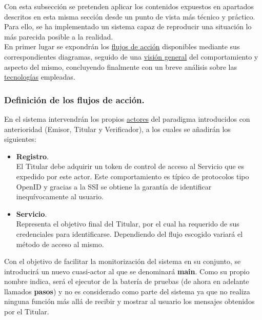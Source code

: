 \documentclass[../main.tex]{subfiles}
\begin{document}
Con esta subsección se pretenden aplicar los contenidos expuestos en apartados descritos en esta misma sección desde un punto de vista más técnico y práctico. Para ello, se ha implementado un sistema capaz de reproducir una situación lo más parecida posible a la realidad. 
\\

En primer lugar se expondrán los \hyperref[Definición de flujos de acción]{flujos de acción} disponibles mediante sus correspondientes diagramas, seguido de una \hyperref[Visión general del sistema]{visión general} del comportamiento y aspecto del mismo, concluyendo finalmente con un breve análisis sobre las \hyperref[Análisis sobre las tecnologías empleadas]{tecnologías} empleadas.
\\

\subsubsection{Definición de los flujos de acción.}\label{Definición de flujos de acción}

En el sistema intervendrán los propios \hyperref[Actores y sus funciones en el paradigma]{actores} del paradigma introducidos con anterioridad (Emisor, Titular y Verificador), a los cuales se añadirán los siguientes:

\begin{itemize}
    \item \textbf{Registro}. \\
    El Titular debe adquirir un token de control de acceso al Servicio que es expedido por este actor. Este comportamiento es típico de protocolos tipo \Gls{OpenID} y gracias a la \acrshort{SSI} se obtiene la garantía de identificar inequívocamente al usuario. 

    \item \textbf{Servicio}. \\
    Representa el objetivo final del Titular, por el cual ha requerido de sus credenciales para identificarse. Dependiendo del flujo escogido variará  el método de acceso al mismo.\\
    
\end{itemize}

Con el objetivo de facilitar la monitorización del sistema en su conjunto, se introducirá un nuevo cuasi-actor al que se denominará \textbf{main}. Como su propio nombre indica, será el ejecutor de la batería de pruebas (de ahora en adelante llamados \textbf{pasos}) y no es considerado como parte del sistema ya que no realiza ninguna función más allá de recibir y mostrar al usuario los mensajes obtenidos por el Titular. 
\end{document}
